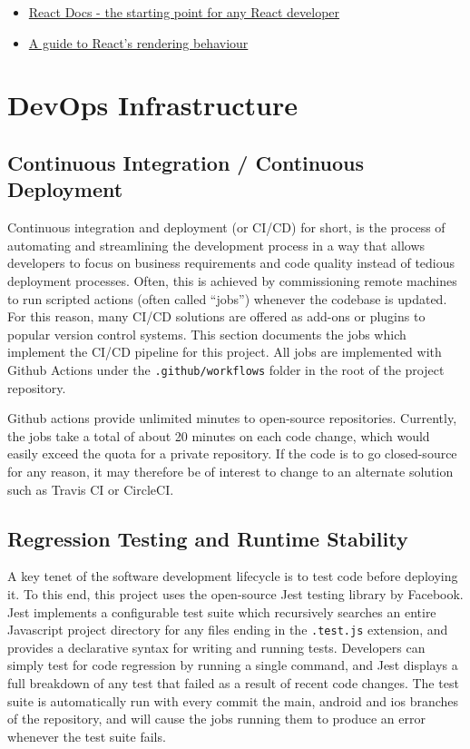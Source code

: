 \begin{itemize}
    \item \href{https://reactjs.org/docs/hello-world.html}{React Docs - the starting point for any React developer}
    \item \href{https://blog.isquaredsoftware.com/2020/05/blogged-answers-a-mostly-complete-guide-to-react-rendering-behavior/#rendering-process-overview}{A guide to React's rendering behaviour}
\end{itemize}

\section{DevOps Infrastructure}
\subsection{Continuous Integration / Continuous Deployment}
Continuous integration and deployment (or CI/CD) for short, is the process of automating and streamlining the development process in a way that allows developers to focus on business requirements and code quality instead of tedious deployment processes. Often, this is achieved by commissioning remote machines to run scripted actions (often called ``jobs'') whenever the codebase is updated. For this reason, many CI/CD solutions are offered as add-ons or plugins to popular version control systems. This section documents the jobs which implement the CI/CD pipeline for this project. All jobs are implemented with Github Actions under the \texttt{.github/workflows} folder in the root of the project repository.

Github actions provide unlimited minutes to open-source repositories. Currently, the jobs take a total of about 20 minutes on each code change, which would easily exceed the quota for a private repository. If the code is to go closed-source for any reason, it may therefore be of interest to change to an alternate solution such as Travis CI or CircleCI.

\subsection{Regression Testing and Runtime Stability}
A key tenet of the software development lifecycle is to test code before deploying it. To this end, this project uses the open-source Jest testing library by Facebook. Jest implements a configurable test suite which recursively searches an entire Javascript project directory for any files ending in the \texttt{.test.js} extension, and provides a declarative syntax for writing and running tests. Developers can simply test for code regression by running a single command, and Jest displays a full breakdown of any test that failed as a result of recent code changes. The test suite is automatically run with every commit the main, android and ios branches of the repository, and will cause the jobs running them to produce an error whenever the test suite fails.

